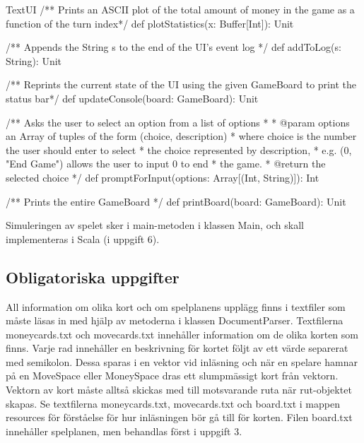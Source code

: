 \begin{ScalaSpec}{TextUI}
   /** Prints an ASCII plot of the total amount 
	of money in the game as a function of the turn index*/
  def plotStatistics(x: Buffer[Int]): Unit

  /** Appends the String s to the end of the UI's event log */
  def addToLog(s: String): Unit 

  /** Reprints the current state of the UI using the given
	GameBoard to print the status bar*/
  def updateConsole(board: GameBoard): Unit 

 
  /** Asks the user to select an option from a list of options
    *
    * @param options an Array of tuples of the form (choice, description)
    *                where choice is the number the user should enter to select 
    *                the choice represented by description,
    *                e.g. (0,  "End Game") allows the user to input 0 to end 
    *                the game.
    * @return        the selected choice
    */
  def promptForInput(options: Array[(Int, String)]): Int 

  /** Prints the entire GameBoard */
  def printBoard(board: GameBoard): Unit 

 
\end{ScalaSpec}

Simuleringen av spelet sker i main-metoden i klassen Main, och skall implementeras i Scala (i uppgift 6).


\subsection{Obligatoriska uppgifter}

\Task All information om olika kort och om spelplanens upplägg finns i textfiler som måste läsas in med hjälp av metoderna i klassen DocumentParser. 
Textfilerna moneycards.txt och movecards.txt innehåller information om de olika korten som finns.
Varje rad innehåller en beskrivning för kortet följt av ett värde separerat med semikolon. Dessa sparas i en vektor vid inläsning och när en spelare hamnar på en MoveSpace eller MoneySpace dras ett slumpmässigt kort från vektorn. 
Vektorn av kort måste alltså skickas med till motsvarande ruta när rut-objektet skapas.
Se textfilerna moneycards.txt, movecards.txt och board.txt i mappen resources för förståelse för hur inläsningen bör gå till för korten.
Filen board.txt innehåller spelplanen, men behandlas först i uppgift 3.



